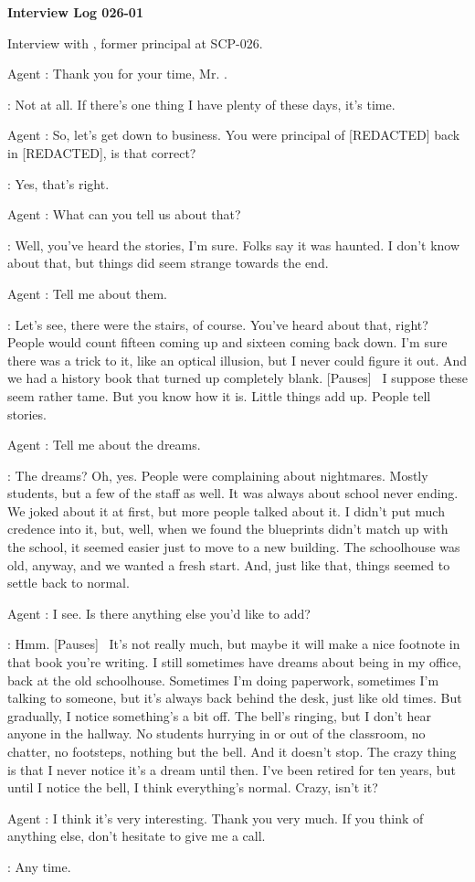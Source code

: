 \textbf{Interview Log 026-01}

Interview with  , former principal at SCP-026.

Agent : Thank you for your time, Mr. .

: Not at all. If there's one thing I have plenty of these days, it's time.

Agent : So, let's get down to business. You were principal of [REDACTED] back in [REDACTED], is that correct?

: Yes, that's right.

Agent : What can you tell us about that?

: Well, you've heard the stories, I'm sure. Folks say it was haunted. I don't know about that, but things did seem strange towards the end.

Agent : Tell me about them.

: Let's see, there were the stairs, of course. You've heard about that, right? People would count fifteen coming up and sixteen coming back down. I'm sure there was a trick to it, like an optical illusion, but I never could figure it out. And we had a history book that turned up completely blank. [Pauses] \ I suppose these seem rather tame. But you know how it is. Little things add up. People tell stories.

Agent : Tell me about the dreams.

: The dreams? Oh, yes. People were complaining about nightmares. Mostly students, but a few of the staff as well. It was always about school never ending. We joked about it at first, but more people talked about it. I didn't put much credence into it, but, well, when we found the blueprints didn't match up with the school, it seemed easier just to move to a new building. The schoolhouse was old, anyway, and we wanted a fresh start. And, just like that, things seemed to settle back to normal.

Agent : I see. Is there anything else you'd like to add?

: Hmm. [Pauses] \ It's not really much, but maybe it will make a nice footnote in that book you're writing. I still sometimes have dreams about being in my office, back at the old schoolhouse. Sometimes I'm doing paperwork, sometimes I'm talking to someone, but it's always back behind the desk, just like old times. But gradually, I notice something's a bit off. The bell's ringing, but I don't hear anyone in the hallway. No students hurrying in or out of the classroom, no chatter, no footsteps, nothing but the bell. And it doesn't stop. The crazy thing is that I never notice it's a dream until then. I've been retired for ten years, but until I notice the bell, I think everything's normal. Crazy, isn't it?

Agent : I think it's very interesting. Thank you very much. If you think of anything else, don't hesitate to give me a call.

: Any time.